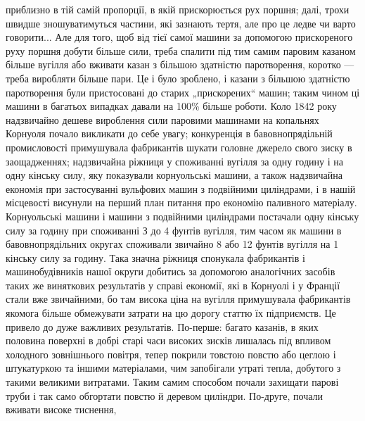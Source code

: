 приблизно в тій самій пропорції, в якій прискорюється рух поршня;
далі, трохи швидше зношуватимуться частини, які зазнають
тертя, але про це ледве чи варто говорити... Але для того, щоб
від тієї самої машини за допомогою прискореного руху поршня
добути більше сили, треба спалити під тим самим паровим казаном більше вугілля або вживати казан з
більшою здатністю паротворення, коротко — треба виробляти більше пари. Це і було
зроблено, і казани з більшою здатністю паротворення були пристосовані до старих „прискорених“ машин;
таким чином ці машини в багатьох випадках давали на 100\% більше роботи. Коло
1842 року надзвичайно дешеве вироблення сили паровими машинами на копальнях Корнуоля почало
викликати до себе увагу;
конкуренція в бавовнопрядільній промисловості примушувала
фабрикантів шукати головне джерело свого зиску в заощадженнях; надзвичайна ріжниця у споживанні
вугілля за одну годину
і на одну кінську силу, яку показували корнуольські машини,
а також надзвичайна економія при застосуванні вульфових машин
з подвійними циліндрами, і в нашій місцевості висунули на перший
план питання про економію паливного матеріалу. Корнуольські
машини і машини з подвійними циліндрами постачали одну кінську
силу за годину при споживанні З  до 4 фунтів вугілля, тим часом як машини в бавовнопрядільних
округах споживали звичайно 8 або 12 фунтів вугілля на 1 кінську силу за годину.
Така значна ріжниця спонукала фабрикантів і машинобудівників
нашої округи добитись за допомогою аналогічних засобів таких же
виняткових результатів у справі економії, які в Корнуолі і у Франції стали вже звичайними, бо там
висока ціна на вугілля примушувала фабрикантів якомога більше обмежувати затрати на цю дорогу статтю
їх підприємств. Це привело до дуже важливих результатів. По-перше: багато казанів, в яких половина
поверхні в добрі
старі часи високих зисків лишалась під впливом холодного зовнішнього повітря, тепер покрили товстою
повстю або цеглою і штукатуркою та іншими матеріалами, чим запобігали утраті тепла,
добутого з такими великими витратами. Таким самим способом
почали захищати парові труби і так само обгортати повстю й деревом циліндри. По-друге, почали
вживати високе тиснення,
\parbreak{}  %
